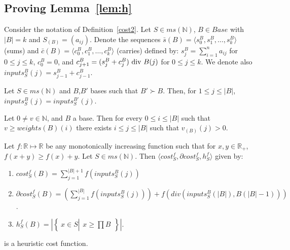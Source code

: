 \documentclass[envcountsame]{llncs}
\newcommand\tuple[1]{\langle #1 \rangle}
\newcommand{\Base}{\mathit{Base}}
\newcommand{\intMultiSet}{\mathit{ms(\mathbb{N})}}
\newcommand{\cost}{\mathit{cost}}
\newcommand{\sset}[2]{\left\{~#1  \left|
      \begin{array}{l}#2\end{array}
    \right.     \right\}}
\begin{document}
\subsection{Proving Lemma~\ref{lem:h}}
Consider the
notation of Definition~\ref{cost2}.  Let $S\in\intMultiSet$,
$B\in\Base$ with $|B|=k$ and $S_{(B)}=(a_{ij})$.
Denote the sequences $\bar s(B)=\tuple{s_0^B,s_1^B,\ldots,s_k^B}$
(sums) and $\bar c(B)= \tuple{c_0^B,c_1^B,\ldots,c_k^B}$ (carries)
defined by:
$s_j^B=\sum_{i=1}^n a_{ij}$ for $0\leq j\leq k$, $c_0^B=0$, and 
$c_{j+1}^B = (s_j^B+c_j^B) \mbox{\rm ~div~} B(j)$ for $0\leq j\leq k$.
We denote also $inputs_S^B(j)=s_{j-1}^B+c_{j-1}^B$.


\begin{proposition}
\label{pSubBase1} 
Let $S\in\intMultiSet$ and $B$,$B'$ bases such that $B'\succ B$.
Then, for $1 \leq j \leq |B|$, $inputs_S^B(j)=inputs_S^{B'}(j)$.
\end{proposition}


\begin{proposition}
\label{pSubBase2}
Let $0 \neq v\in \mathbb{N}$, and $B$ a base.  Then for every $0 \leq
i \leq |B|$ such that $v \geq weights(B)(i)$ there exists $i\leq j \leq
|B|$ such that $v_{(B)}(j) > 0$.
\end{proposition}

\begin{proposition}
\label{lHC}
Let $f:\mathbb{R} \mapsto \mathbb{R}$ be any monotonically increasing
function such that for $x,y \in \mathbb{R_{+}}$, $f(x+y) \geq f(x)+y$.
Let $S\in\intMultiSet$. Then $\tuple{cost_S^f, \partial
  \cost_S^f,h_S^f}$ given by:
\begin{enumerate}
\item 
$cost_S^f(B) = \sum_{j=1}^{|B|+1} f(inputs_S^B(j))$
\item 
$\partial\cost_S^f(B) =
	\left(\sum_{j=1}^{|B|} 
           f(inputs_S^B(j))
        \right) + f(div(inputs_S^B(|B|),B(|B|-1)))$.
\item 
$h_S^f(B) = \left| \sset{x \in S}{ x \geq \prod B} \right|$.
\end{enumerate}
	is a heuristic cost function.
\end{proposition}
\end{document}
